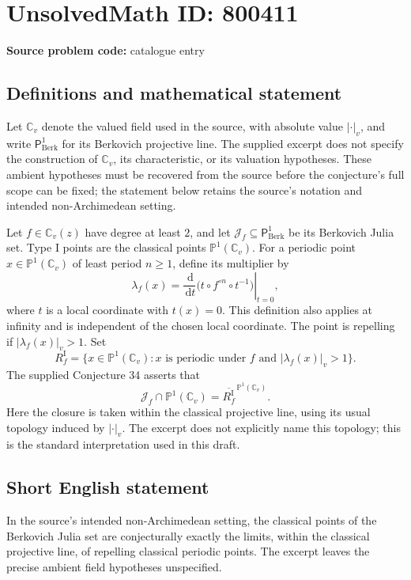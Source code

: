 \documentclass[11pt]{article}
\newcommand{\C}{\mathbb{C}}
\newcommand{\PP}{\mathbb{P}}
\newcommand{\dd}{\,\mathrm{d}}
\begin{document}
\section*{UnsolvedMath ID: 800411}
\textbf{Source problem code:} catalogue entry
\subsection{Definitions and mathematical statement}
Let \(\C_v\) denote the valued field used in the source, with absolute value \(|\cdot|_v\), and write \(\mathsf{P}^{1}_{\mathrm{Berk}}\) for its Berkovich projective line. The supplied excerpt does not specify the construction of \(\C_v\), its characteristic, or its valuation hypotheses. These ambient hypotheses must be recovered from the source before the conjecture's full scope can be fixed; the statement below retains the source's notation and intended non-Archimedean setting.

Let \(f\in\C_v(z)\) have degree at least \(2\), and let \(\mathcal J_f\subseteq\mathsf{P}^{1}_{\mathrm{Berk}}\) be its Berkovich Julia set. Type I points are the classical points \(\PP^1(\C_v)\). For a periodic point \(x\in\PP^1(\C_v)\) of least period \(n\geq1\), define its multiplier by
\[
\lambda_f(x)=\left.\frac{\dd}{\dd t}\bigl(t\circ f^{\circ n}\circ t^{-1}\bigr)\right|_{t=0},
\]
where \(t\) is a local coordinate with \(t(x)=0\). This definition also applies at infinity and is independent of the chosen local coordinate. The point is repelling if \(|\lambda_f(x)|_v>1\). Set
\[
R_f^{\mathrm I}=\bigl\{x\in\PP^1(\C_v):x\text{ is periodic under }f\text{ and }|\lambda_f(x)|_v>1\bigr\}.
\]
The supplied Conjecture 34 asserts that
\[
\mathcal J_f\cap\PP^1(\C_v)
=
\overline{R_f^{\mathrm I}}^{\,\PP^1(\C_v)}.
\]
Here the closure is taken within the classical projective line, using its usual topology induced by \(|\cdot|_v\). The excerpt does not explicitly name this topology; this is the standard interpretation used in this draft.
\subsection{Short English statement}
In the source's intended non-Archimedean setting, the classical points of the Berkovich Julia set are conjecturally exactly the limits, within the classical projective line, of repelling classical periodic points. The excerpt leaves the precise ambient field hypotheses unspecified.
\end{document}
